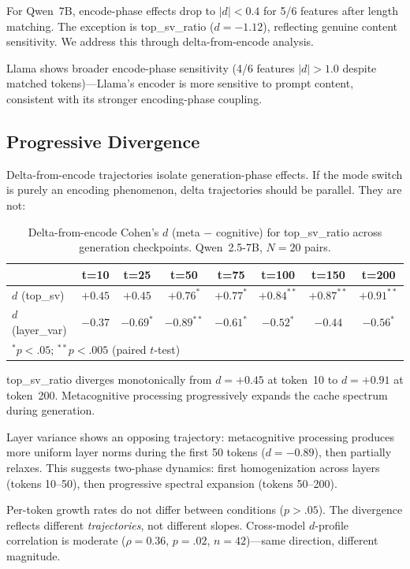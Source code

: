 \documentclass[11pt,a4paper]{article}
\begin{document}
For Qwen~7B, encode-phase effects drop to $|d| < 0.4$ for 5/6 features
after length matching. The exception is top\_sv\_ratio ($d = -1.12$),
reflecting genuine content sensitivity. We address this through
delta-from-encode analysis.

Llama shows broader encode-phase sensitivity (4/6 features $|d| > 1.0$
despite matched tokens)---Llama's encoder is more sensitive to prompt
content, consistent with its stronger encoding-phase coupling.

\subsection{Progressive Divergence}

Delta-from-encode trajectories isolate generation-phase effects. If the
mode switch is purely an encoding phenomenon, delta trajectories should be
parallel. They are not:

\begin{table}[H]
\centering
\caption{Delta-from-encode Cohen's $d$ (meta $-$ cognitive) for top\_sv\_ratio across generation checkpoints. Qwen~2.5-7B, $N = 20$ pairs.}
\label{tab:study3_trajectory}
\begin{tabular}{lccccccc}
\toprule
 & \textbf{t=10} & \textbf{t=25} & \textbf{t=50} & \textbf{t=75} & \textbf{t=100} & \textbf{t=150} & \textbf{t=200} \\
\midrule
$d$ (top\_sv)    & $+0.45$ & $+0.45$ & $+0.76^*$ & $+0.77^*$ & $+0.84^{**}$ & $+0.87^{**}$ & $+0.91^{**}$ \\
$d$ (layer\_var) & $-0.37$ & $-0.69^*$ & $-0.89^{**}$ & $-0.61^*$ & $-0.52^*$ & $-0.44$ & $-0.56^*$ \\
\bottomrule
\multicolumn{8}{l}{\footnotesize $^*p < .05$; $^{**}p < .005$ (paired $t$-test)}
\end{tabular}
\end{table}

top\_sv\_ratio diverges monotonically from $d = +0.45$ at token~10 to
$d = +0.91$ at token~200. Metacognitive processing progressively
expands the cache spectrum during generation.

Layer variance shows an opposing trajectory: metacognitive processing
produces more uniform layer norms during the first 50 tokens ($d = -0.89$),
then partially relaxes. This suggests two-phase dynamics: first
homogenization across layers (tokens 10--50), then progressive spectral
expansion (tokens 50--200).

Per-token growth rates do not differ between conditions ($p > .05$). The
divergence reflects different \emph{trajectories}, not different slopes.
Cross-model $d$-profile correlation is moderate ($\rho = 0.36$, $p = .02$,
$n = 42$)---same direction, different magnitude.
\end{document}
